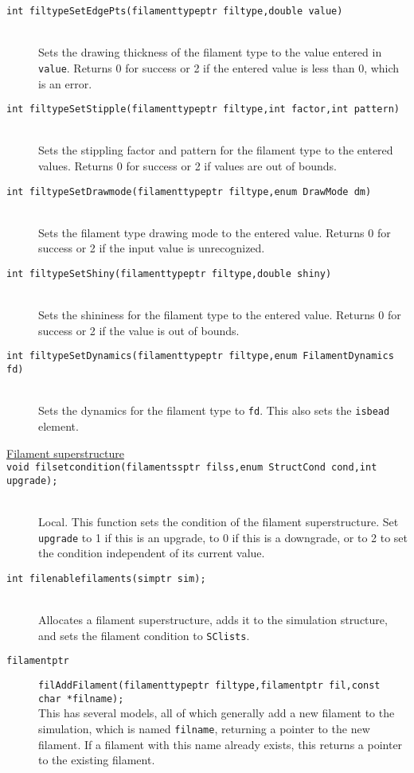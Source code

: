\documentclass {scrbook}
\newcommand {\ttt} {\texttt}
\begin{document}
\begin{description}
\item[\ttt{int filtypeSetEdgePts(filamenttypeptr filtype,double value)}]
\hfill \\
Sets the drawing thickness of the filament type to the value entered in \ttt{value}. Returns 0 for success or 2 if the entered value is less than 0, which is an error.

\item[\ttt{int filtypeSetStipple(filamenttypeptr filtype,int factor,int pattern)}]
\hfill \\
Sets the stippling factor and pattern for the filament type to the entered values. Returns 0 for success or 2 if values are out of bounds.

\item[\ttt{int filtypeSetDrawmode(filamenttypeptr filtype,enum DrawMode dm)}]
\hfill \\
Sets the filament type drawing mode to the entered value. Returns 0 for success or 2 if the input value is unrecognized.

\item[\ttt{int filtypeSetShiny(filamenttypeptr filtype,double shiny)}]
\hfill \\
Sets the shininess for the filament type to the entered value. Returns 0 for success or 2 if the value is out of bounds.

\item[\ttt{int filtypeSetDynamics(filamenttypeptr filtype,enum FilamentDynamics fd)}]
\hfill \\
Sets the dynamics for the filament type to \ttt{fd}. This also sets the \ttt{isbead} element.


\item[\underline{Filament superstructure}]

\item[\ttt{void filsetcondition(filamentssptr filss,enum StructCond cond,int upgrade);}]
\hfill \\
Local. This function sets the condition of the filament superstructure. Set \ttt{upgrade} to 1 if this is an upgrade, to 0 if this is a downgrade, or to 2 to set the condition independent of its current value.

\item[\ttt{int filenablefilaments(simptr sim);}]
\hfill \\
Allocates a filament superstructure, adds it to the simulation structure, and sets the filament condition to \ttt{SClists}.

\item[\ttt{filamentptr}]
\ttt{filAddFilament(filamenttypeptr filtype,filamentptr fil,const char *filname);}
\hfill \\
This has several models, all of which generally add a new filament to the simulation, which is named \ttt{filname}, returning a pointer to the new filament. If a filament with this name already exists, this returns a pointer to the existing filament.


\end{description}
\end{document}
